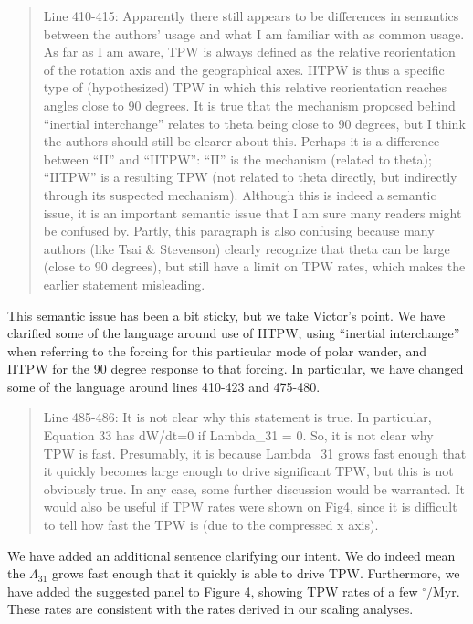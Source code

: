 \documentclass[a4paper,12pt]{article}
\begin{document}
\begin{quote}
Line 410-415: Apparently there still appears to be differences in semantics between the authors’ usage and what I am familiar with as common usage. As far as I am aware, TPW is always defined as the relative reorientation of the rotation axis and the geographical axes. IITPW is thus a specific type of (hypothesized) TPW in which this relative reorientation reaches angles close to 90 degrees. It is true that the mechanism proposed behind “inertial interchange” relates to theta being close to 90 degrees, but I think the authors should still be clearer about this. Perhaps it is a difference between ``II'' and ``IITPW'': ``II'' is the mechanism (related to theta); ``IITPW'' is a resulting TPW (not related to theta directly, but indirectly through its suspected mechanism). Although this is indeed a semantic issue, it is an important semantic issue that I am sure many readers might be confused by. Partly, this paragraph is also confusing because many authors (like Tsai \& Stevenson) clearly recognize that theta can be large (close to 90 degrees), but still have a limit on TPW rates, which makes the earlier statement misleading.
\end{quote}
This semantic issue has been a bit sticky, but we take Victor's point.
We have clarified some of the language around use of IITPW, using ``inertial interchange''
when referring to the forcing for this particular mode of polar wander, and IITPW
for the 90 degree response to that forcing. In particular, we have changed some of the language
around lines 410-423 and 475-480.

\begin{quote}
Line 485-486: It is not clear why this statement is true. In particular, Equation 33 has dW/dt=0 if Lambda\_31 = 0. So, it is not clear why TPW is fast. Presumably, it is because Lambda\_31 grows fast enough that it quickly becomes large enough to drive significant TPW, but this is not obviously true. In any case, some further discussion would be warranted. It would also be useful if TPW rates were shown on Fig4, since it is difficult to tell how fast the TPW is (due to the compressed x axis).
\end{quote}
We have added an additional sentence clarifying our intent. We do indeed mean the $\Lambda_{31}$
grows fast enough that it quickly is able to drive TPW.
Furthermore, we have added the suggested panel to Figure 4, showing TPW rates of a few $^\circ$/Myr.
These rates are consistent with the rates derived in our scaling analyses.
\end{document}
